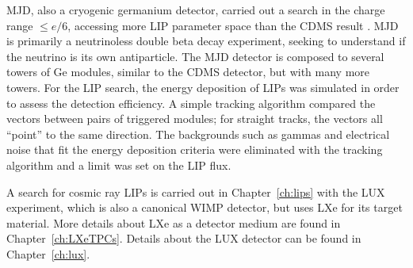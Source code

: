 \ac{MJD}, also a cryogenic germanium detector, carried out a search in the charge range $\leqslant e/6$, accessing more \ac{LIP} parameter space than the \ac{CDMS} result \cite{Alvis2018}. \ac{MJD} is primarily a neutrinoless double beta decay experiment, seeking to understand if the neutrino is its own antiparticle. The \ac{MJD} detector is composed to several towers of Ge modules, similar to the \ac{CDMS} detector, but with many more towers. For the \ac{LIP} search, the energy deposition of \ac{LIP}s was simulated in order to assess the detection efficiency. A simple tracking algorithm compared the vectors between pairs of triggered modules; for straight tracks, the vectors all ``point'' to the same direction. The backgrounds such as gammas and electrical noise that fit the energy deposition criteria were eliminated with the tracking algorithm and a limit was set on the \ac{LIP} flux. 

A search for cosmic ray \ac{LIP}s is carried out in Chapter~\ref{ch:lips} with the \ac{LUX} experiment, which is also a canonical \ac{WIMP} detector, but uses \ac{LXe} for its target material. More details about \ac{LXe} as a detector medium are found in Chapter~\ref{ch:LXeTPCs}. Details about the \ac{LUX} detector can be found in Chapter~\ref{ch:lux}.






